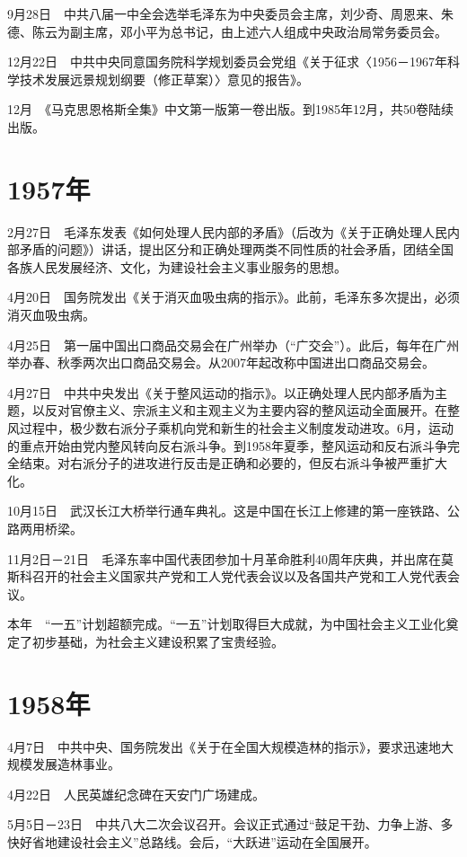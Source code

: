 \documentclass[10pt,a4paper,twocolumn]{book}
\begin{document}
9月28日　中共八届一中全会选举毛泽东为中央委员会主席，刘少奇、周恩来、朱德、陈云为副主席，邓小平为总书记，由上述六人组成中央政治局常务委员会。

12月22日　中共中央同意国务院科学规划委员会党组《关于征求〈1956－1967年科学技术发展远景规划纲要（修正草案）〉意见的报告》。

12月　《马克思恩格斯全集》中文第一版第一卷出版。到1985年12月，共50卷陆续出版。

\section{1957年}

2月27日　毛泽东发表《如何处理人民内部的矛盾》（后改为《关于正确处理人民内部矛盾的问题》）讲话，提出区分和正确处理两类不同性质的社会矛盾，团结全国各族人民发展经济、文化，为建设社会主义事业服务的思想。

4月20日　国务院发出《关于消灭血吸虫病的指示》。此前，毛泽东多次提出，必须消灭血吸虫病。

4月25日　第一届中国出口商品交易会在广州举办（“广交会”）。此后，每年在广州举办春、秋季两次出口商品交易会。从2007年起改称中国进出口商品交易会。

4月27日　中共中央发出《关于整风运动的指示》。以正确处理人民内部矛盾为主题，以反对官僚主义、宗派主义和主观主义为主要内容的整风运动全面展开。在整风过程中，极少数右派分子乘机向党和新生的社会主义制度发动进攻。6月，运动的重点开始由党内整风转向反右派斗争。到1958年夏季，整风运动和反右派斗争完全结束。对右派分子的进攻进行反击是正确和必要的，但反右派斗争被严重扩大化。

10月15日　武汉长江大桥举行通车典礼。这是中国在长江上修建的第一座铁路、公路两用桥梁。

11月2日－21日　毛泽东率中国代表团参加十月革命胜利40周年庆典，并出席在莫斯科召开的社会主义国家共产党和工人党代表会议以及各国共产党和工人党代表会议。

本年　“一五”计划超额完成。“一五”计划取得巨大成就，为中国社会主义工业化奠定了初步基础，为社会主义建设积累了宝贵经验。

\section{1958年}

4月7日　中共中央、国务院发出《关于在全国大规模造林的指示》，要求迅速地大规模发展造林事业。

4月22日　人民英雄纪念碑在天安门广场建成。

5月5日－23日　中共八大二次会议召开。会议正式通过“鼓足干劲、力争上游、多快好省地建设社会主义”总路线。会后，“大跃进”运动在全国展开。
\end{document}
